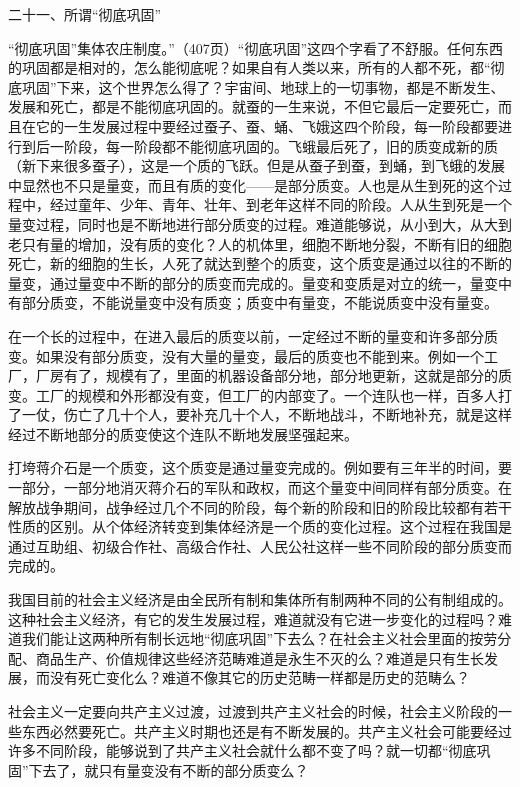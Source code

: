 二十一、所谓“彻底巩固”

“彻底巩固”集体农庄制度。”（407页）“彻底巩固”这四个字看了不舒服。任何东西的巩固都是相对的，怎么能彻底呢？如果自有人类以来，所有的人都不死，都“彻底巩固”下来，这个世界怎么得了？宇宙间、地球上的一切事物，都是不断发生、发展和死亡，都是不能彻底巩固的。就蚕的一生来说，不但它最后一定要死亡，而且在它的一生发展过程中要经过蚕子、蚕、蛹、飞娥这四个阶段，每一阶段都要进行到后一阶段，每一阶段都不能彻底巩固的。飞蛾最后死了，旧的质变成新的质（新下来很多蚕子），这是一个质的飞跃。但是从蚕子到蚕，到蛹，到飞蛾的发展中显然也不只是量变，而且有质的变化——是部分质变。人也是从生到死的这个过程中，经过童年、少年、青年、壮年、到老年这样不同的阶段。人从生到死是一个量变过程，同时也是不断地进行部分质变的过程。难道能够说，从小到大，从大到老只有量的增加，没有质的变化？人的机体里，细胞不断地分裂，不断有旧的细胞死亡，新的细胞的生长，人死了就达到整个的质变，这个质变是通过以往的不断的量变，通过量变中不断的部分的质变而完成的。量变和变质是对立的统一，量变中有部分质变，不能说量变中没有质变；质变中有量变，不能说质变中没有量变。

在一个长的过程中，在进入最后的质变以前，一定经过不断的量变和许多部分质变。如果没有部分质变，没有大量的量变，最后的质变也不能到来。例如一个工厂，厂房有了，规模有了，里面的机器设备部分地，部分地更新，这就是部分的质变。工厂的规模和外形都没有变，但工厂的内部变了。一个连队也一样，百多人打了一仗，伤亡了几十个人，要补充几十个人，不断地战斗，不断地补充，就是这样经过不断地部分的质变使这个连队不断地发展坚强起来。

打垮蒋介石是一个质变，这个质变是通过量变完成的。例如要有三年半的时间，要一部分，一部分地消灭蒋介石的军队和政权，而这个量变中间同样有部分质变。在解放战争期间，战争经过几个不同的阶段，每个新的阶段和旧的阶段比较都有若干性质的区别。从个体经济转变到集体经济是一个质的变化过程。这个过程在我国是通过互助组、初级合作社、高级合作社、人民公社这样一些不同阶段的部分质变而完成的。

我国目前的社会主义经济是由全民所有制和集体所有制两种不同的公有制组成的。这种社会主义经济，有它的发生发展过程，难道就没有它进一步变化的过程吗？难道我们能让这两种所有制长远地“彻底巩固”下去么？在社会主义社会里面的按劳分配、商品生产、价值规律这些经济范畴难道是永生不灭的么？难道是只有生长发展，而没有死亡变化么？难道不像其它的历史范畴一样都是历史的范畴么？

社会主义一定要向共产主义过渡，过渡到共产主义社会的时候，社会主义阶段的一些东西必然要死亡。共产主义时期也还是有不断发展的。共产主义社会可能要经过许多不同阶段，能够说到了共产主义社会就什么都不变了吗？就一切都“彻底巩固”下去了，就只有量变没有不断的部分质变么？

